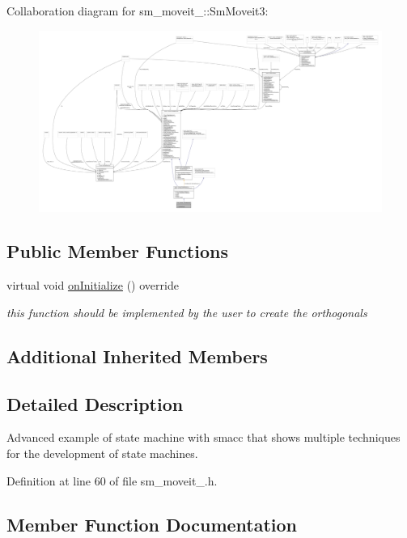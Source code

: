 Collaboration diagram for sm\+\_\+moveit\+\_\+:\+:Sm\+Moveit3\+:
\nopagebreak
\begin{figure}[H]
\begin{center}
\leavevmode
\includegraphics[width=350pt]{structsm__moveit__3_1_1SmMoveit3__coll__graph}
\end{center}
\end{figure}
\subsection*{Public Member Functions}
\begin{DoxyCompactItemize}
\item 
virtual void \hyperlink{structsm__moveit__3_1_1SmMoveit3_afc1eae2ab78a27cd88d642b762501208}{on\+Initialize} () override
\begin{DoxyCompactList}\small\item\em this function should be implemented by the user to create the orthogonals \end{DoxyCompactList}\end{DoxyCompactItemize}
\subsection*{Additional Inherited Members}


\subsection{Detailed Description}
Advanced example of state machine with smacc that shows multiple techniques for the development of state machines. 

Definition at line 60 of file sm\+\_\+moveit\+\_.\+h.



\subsection{Member Function Documentation}
\mbox{\label{structsm__moveit__3_1_1SmMoveit3_afc1eae2ab78a27cd88d642b762501208}} 
